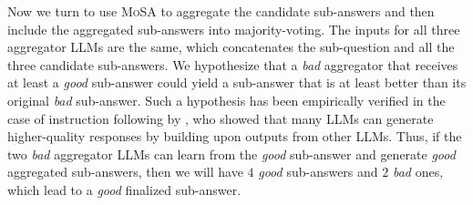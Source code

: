 Now we turn to use \textsc{MoSA} to aggregate the candidate sub-answers and then include the aggregated sub-answers into majority-voting.
The inputs for all three aggregator LLMs are the same, which concatenates the sub-question and all the three candidate sub-answers.
We hypothesize that a \emph{bad} aggregator that receives at least a \emph{good} sub-answer could yield a sub-answer that is at least better than its original \emph{bad} sub-answer.
Such a hypothesis has been empirically verified in the case of instruction following by \citet{moa}, who showed that many LLMs can generate higher-quality responses by building upon outputs from other LLMs.
Thus, if the two \emph{bad} aggregator LLMs can learn from the \emph{good} sub-answer and generate \emph{good} aggregated sub-answers, then we will have $4$ \emph{good} sub-answers and $2$ \emph{bad} ones, which lead to a \emph{good} finalized sub-answer.